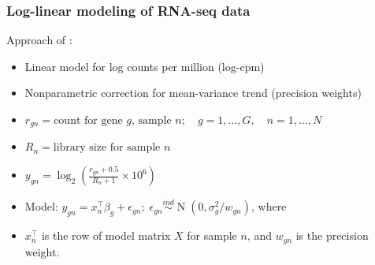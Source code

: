 \documentclass[handout]{beamer}
\newcommand{\op}{\operatorname}
\newcommand{\ind}{\stackrel{ind}{\sim}}
\begin{document}
\begin{frame}
  \frametitle{Log-linear modeling of RNA-seq data}
  Approach of \citep{voom}:
  \begin{itemize}
    \item Linear model for log counts per million (log-cpm)
    \pause \item Nonparametric correction for mean-variance trend (precision weights)
    \pause \item $r_{gn} = \mbox{count for gene }g \mbox{, sample }n;\quad g=1,\ldots,G,\quad n=1,\ldots,N$
    \pause \item $R_n = \mbox{library size for sample }n$
    \pause \item $y_{gn} = \log_2 \left(\frac{r_{gn}+0.5}{R_n+1}\times 10^6\right)$
    \pause \item Model: $y_{gn} = x_n^\top\beta_g + \epsilon_{gn};\; \epsilon_{gn} \ind \op{N}(0,\sigma^2_g/w_{gn})$, \pause where
    \item $x_n^\top$ is the row of model matrix $X$ for sample $n$, and $w_{gn}$ is the precision weight.
  \end{itemize}
\end{frame}
\end{document}
